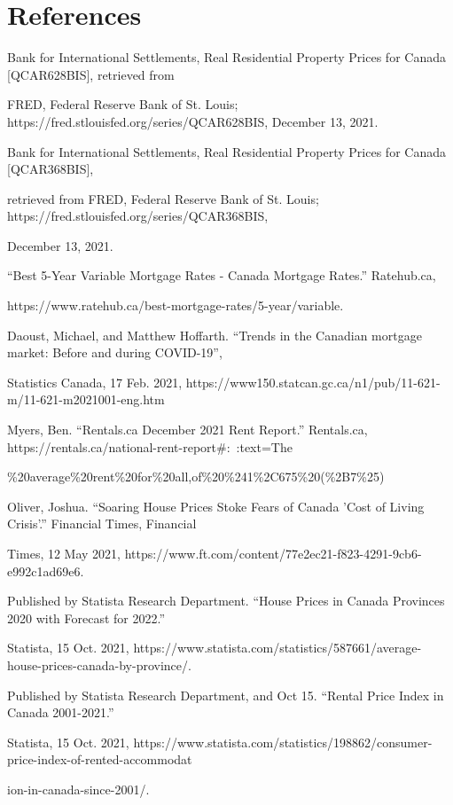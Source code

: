 \documentclass[fontsize=11pt]{article}
\begin{document}
\section*{References}
Bank for International Settlements, Real Residential Property Prices for Canada [QCAR628BIS], retrieved from

FRED, Federal Reserve Bank of St. Louis; https://fred.stlouisfed.org/series/QCAR628BIS, December 13, 2021.

\noindent Bank for International Settlements, Real Residential Property Prices for Canada [QCAR368BIS],

retrieved from FRED, Federal Reserve Bank of St. Louis; https://fred.stlouisfed.org/series/QCAR368BIS,

December 13, 2021.

\noindent “Best 5-Year Variable Mortgage Rates - Canada Mortgage Rates.” Ratehub.ca,

https://www.ratehub.ca/best-mortgage-rates/5-year/variable.

\noindent Daoust, Michael, and Matthew Hoffarth. “Trends in the Canadian mortgage market: Before and during COVID-19”,

Statistics Canada, 17 Feb. 2021, https://www150.statcan.gc.ca/n1/pub/11-621-m/11-621-m2021001-eng.htm

\noindent Myers, Ben. “Rentals.ca December 2021 Rent Report.” Rentals.ca, https://rentals.ca/national-rent-report\#:~:text=The

\%20average\%20rent\%20for\%20all,of\%20\%241\%2C675\%20(\%2B7\%25)

\noindent Oliver, Joshua. “Soaring House Prices Stoke Fears of Canada 'Cost of Living Crisis'.” Financial Times, Financial

Times, 12 May 2021, https://www.ft.com/content/77e2ec21-f823-4291-9cb6-e992c1ad69e6.

\noindent Published by Statista Research Department. “House Prices in Canada Provinces 2020 with Forecast for 2022.”

Statista, 15 Oct. 2021, https://www.statista.com/statistics/587661/average-house-prices-canada-by-province/.

\noindent Published by Statista Research Department, and Oct 15. “Rental Price Index in Canada 2001-2021.”

Statista, 15 Oct. 2021, https://www.statista.com/statistics/198862/consumer-price-index-of-rented-accommodat

ion-in-canada-since-2001/.

\end{document}
